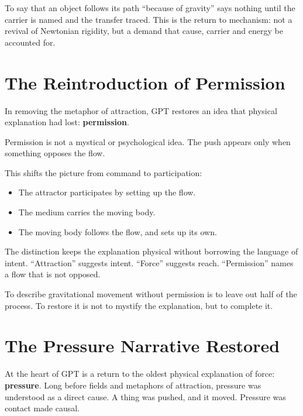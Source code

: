 \documentclass[11pt,a4paper]{article}
\begin{document}
To say that an object follows its path ``because of gravity'' says nothing until the carrier is named and the transfer traced. This is the return to mechanism: not a revival of Newtonian rigidity, but a demand that cause, carrier and energy be accounted for.

\section{The Reintroduction of Permission}

In removing the metaphor of attraction, GPT restores an idea that physical explanation had lost: \textbf{permission}.

Permission is not a mystical or psychological idea.  The push appears only when something opposes the flow.

This shifts the picture from command to participation:
\begin{itemize}
    \item The attractor participates by setting up the flow.
    \item The medium carries the moving body.
    \item The moving body follows the flow, and sets up its own.
\end{itemize}

The distinction keeps the explanation physical without borrowing the language of intent. ``Attraction'' suggests intent. ``Force'' suggests reach. ``Permission'' names a flow that is not opposed.

To describe gravitational movement without permission is to leave out half of the process. To restore it is not to mystify the explanation, but to complete it. 

\section{The Pressure Narrative Restored}

At the heart of GPT is a return to the oldest physical explanation of force: \textbf{pressure}. Long before fields and metaphors of attraction, pressure was understood as a direct cause. A thing was pushed, and it moved. Pressure was contact made causal.
\end{document}
